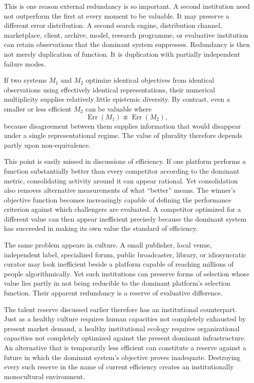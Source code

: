 \documentclass[11pt]{article}
\begin{document}
This is one reason external redundancy is so important. A second institution need not outperform the first at every moment to be valuable. It may preserve a different error distribution. A second search engine, distribution channel, marketplace, client, archive, model, research programme, or evaluative institution can retain observations that the dominant system suppresses. Redundancy is then not merely duplication of function. It is duplication with partially independent failure modes.

If two systems \(M_1\) and \(M_2\) optimize identical objectives from identical observations using effectively identical representations, their numerical multiplicity supplies relatively little epistemic diversity. By contrast, even a smaller or less efficient \(M_2\) can be valuable where
\[
\operatorname{Err}(M_1)
\not\approx
\operatorname{Err}(M_2),
\]
because disagreement between them supplies information that would disappear under a single representational regime. The value of plurality therefore depends partly upon non-equivalence.

This point is easily missed in discussions of efficiency. If one platform performs a function substantially better than every competitor according to the dominant metric, consolidating activity around it can appear rational. Yet consolidation also removes alternative measurements of what ``better'' means. The winner's objective function becomes increasingly capable of defining the performance criterion against which challengers are evaluated. A competitor optimized for a different value can then appear inefficient precisely because the dominant system has succeeded in making its own value the standard of efficiency.

The same problem appears in culture. A small publisher, local venue, independent label, specialized forum, public broadcaster, library, or idiosyncratic curator may look inefficient beside a platform capable of reaching millions of people algorithmically. Yet such institutions can preserve forms of selection whose value lies partly in not being reducible to the dominant platform's selection function. Their apparent redundancy is a reserve of evaluative difference.

The talent reserve discussed earlier therefore has an institutional counterpart. Just as a healthy culture requires human capacities not completely exhausted by present market demand, a healthy institutional ecology requires organizational capacities not completely optimized against the present dominant infrastructure. An alternative that is temporarily less efficient can constitute a reserve against a future in which the dominant system's objective proves inadequate. Destroying every such reserve in the name of current efficiency creates an institutionally monocultural environment.
\end{document}

